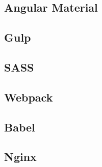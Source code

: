 \subsection{Angular Material}


\subsection{Gulp}


\subsection{SASS}


\subsection{Webpack}


\subsection{Babel}


\subsection{Nginx}